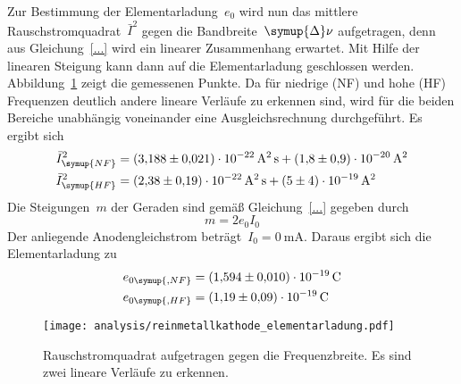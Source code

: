 Zur Bestimmung der Elementarladung~$e_0$ wird nun das mittlere
Rauschstromquadrat~$\bar{I}^2$ gegen die Bandbreite~$\symup{\Delta}\nu$
aufgetragen, denn aus Gleichung~\eqref{...} wird ein linearer Zusammenhang
erwartet. Mit Hilfe der linearen Steigung kann dann auf die Elementarladung
geschlossen werden. Abbildung~\ref{fig:reinmetallkathode_elementarladung} zeigt
die gemessenen Punkte. Da für niedrige (NF) und hohe (HF) Frequenzen deutlich
andere lineare Verläufe zu erkennen sind, wird für die beiden Bereiche
unabhängig voneinander eine Ausgleichsrechnung durchgeführt. Es ergibt sich
%
\begin{align}
    \bar{I}^2_{\symup{NF}}&=\SI{3.188(21)e-22}{\ampere\squared\second}+\SI{1.8(9)e-20}{\ampere\squared} \\
    \bar{I}^2_{\symup{HF}}&=\SI{2.38(19)e-22}{\ampere\squared\second}+\SI{5(4)e-19}{\ampere\squared}
\end{align}
%
Die Steigungen~$m$ der Geraden sind gemäß Gleichung~\eqref{...} gegeben durch
%
\begin{equation}
  m=2e_0I_0
\end{equation}
%
Der anliegende Anodengleichstrom beträgt~$I_0=\SI{0}{\milli\ampere}$. Daraus
ergibt sich die Elementarladung zu
%
\begin{align}
  e_{0\symup{, NF}}&=\SI{1.594(10)e-19}{\coulomb} \\
  e_{0\symup{, HF}}&=\SI{1.19(9)e-19}{\coulomb}
\end{align}

\begin{figure}[htb]
  \centering
  \texttt{[image: analysis/reinmetallkathode\_elementarladung.pdf]}
  \caption{Rauschstromquadrat aufgetragen gegen die Frequenzbreite. Es sind zwei
  lineare Verläufe zu erkennen.}
  \label{fig:reinmetallkathode_elementarladung}
\end{figure}
